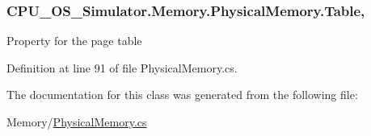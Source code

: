 \subsubsection[{Table}]{ C\+P\+U\+\_\+\+O\+S\+\_\+\+Simulator.\+Memory.\+Physical\+Memory.\+Table\hspace{0.3cm}{\ttfamily [get]}, {\ttfamily [set]}}\label{class_c_p_u___o_s___simulator_1_1_memory_1_1_physical_memory_aaa669f8a92820bf792dd2ccb553254c9}


Property for the page table 



Definition at line 91 of file Physical\+Memory.\+cs.



The documentation for this class was generated from the following file\+:\begin{DoxyCompactItemize}
\item 
Memory/\hyperlink{_physical_memory_8cs}{Physical\+Memory.\+cs}\end{DoxyCompactItemize}
